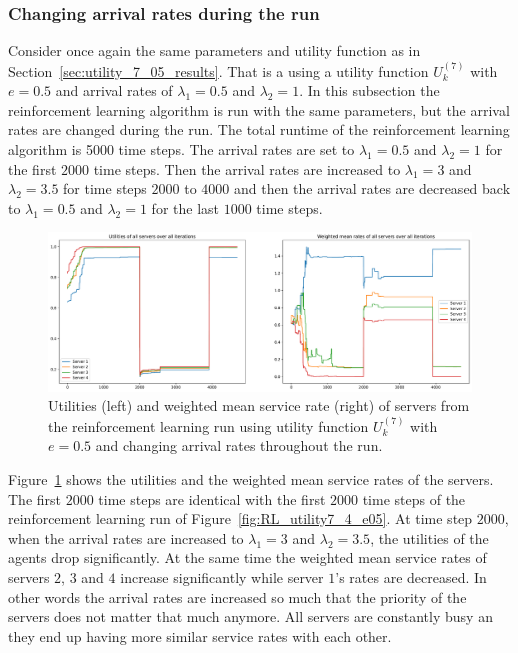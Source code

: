 \subsubsection{Changing arrival rates during the run}
\label{subsubsec:reinforcement_learning_special_case}

Consider once again the same parameters and utility function as in
Section~\ref{sec:utility_7_05_results}.
That is a using a utility function \(U_k^{(7)}\) with \(e = 0.5\) and arrival
rates of \(\lambda_1 = 0.5\) and \(\lambda_2 = 1\).
In this subsection the reinforcement learning algorithm is run with the same
parameters, but the arrival rates are changed during the run.
The total runtime of the reinforcement learning algorithm is 5000 time steps.
The arrival rates are set to \(\lambda_1 = 0.5\) and \(\lambda_2 = 1\) for the
first \(2000\) time steps.
Then the arrival rates are increased to \(\lambda_1 = 3\) and
\(\lambda_2 = 3.5\) for time steps \(2000\) to \(4000\) and then the arrival
rates are decreased back to \(\lambda_1 = 0.5\) and \(\lambda_2 = 1\) for the
last \(1000\) time steps.

\begin{figure}[H]
    \includegraphics[width=\textwidth]{chapters/06_agent_based_extension/Bin/reinforcement_learning_results/utility_7/u7_6_final.pdf}
    \caption{Utilities (left) and weighted mean service rate (right) of servers
    from the reinforcement learning run using utility function \(U_k^{(7)}\)
    with \(e = 0.5\) and changing arrival rates throughout the run.}
    \label{fig:RL_utility7_6_final}
\end{figure}

Figure~\ref{fig:RL_utility7_6_final} shows the utilities and the weighted mean
service rates of the servers.
The first \(2000\) time steps are identical with the first \(2000\) time steps
of the reinforcement learning run of Figure~\ref{fig:RL_utility7_4_e05}.
At time step \(2000\), when the arrival rates are increased to \(\lambda_1 = 3\)
and \(\lambda_2 = 3.5\), the utilities of the agents drop significantly.
At the same time the weighted mean service rates of servers \(2\), \(3\) and
\(4\) increase significantly while server \(1\)'s rates are decreased.
In other words the arrival rates are increased so much that the priority of
the servers does not matter that much anymore.
All servers are constantly busy an they end up having more similar service
rates with each other.

